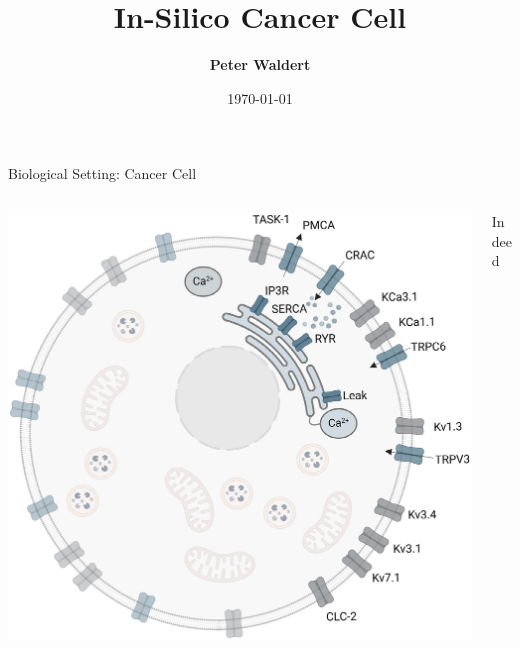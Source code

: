 \documentclass[table, aspectratio=169]{beamer}
\title[IVC Seminar SS2025]{In-Silico Cancer Cell}
\author[Peter Waldert]{\textbf{Peter Waldert}}
\date{\today}
\institute{IVC}
\begin{document}
  \begin{frame}[plain]
    \maketitle
  \end{frame}

  \begin{frame}{Biological Setting: Cancer Cell}
    \begin{columns}
      \begin{column}{0.4\linewidth}
        \includegraphics[width=\linewidth]{../../figures/cell-by-langthaler-et-al.png}
      \end{column}
      \begin{column}{0.58\linewidth}
        Indeed
      \end{column}
    \end{columns}
  \end{frame}
\end{document}
